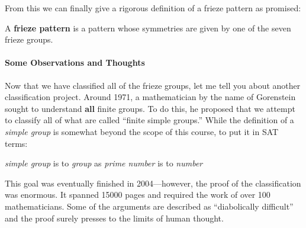 From this we can finally give a rigorous definition of a frieze pattern
as promised:

\begin{dfn}
A \textbf{frieze pattern} is a pattern whose symmetries are given by
one of the seven frieze groups.
\end{dfn}




\paragraph{Some Observations and Thoughts}


Now that we have classified all of the frieze groups, let me tell you about
another classification project. Around 1971, a mathematician by the
name of Gorenstein sought to understand \textbf{all} finite
groups. To do this, he proposed that we attempt to classify all of
what are called ``finite simple groups.'' While the definition of a
\textit{simple group} is somewhat beyond the scope of this course, to
put it in SAT terms:
\begin{center}
\textit{simple group} is to \textit{group} \qquad as \qquad \textit{prime number} is to \textit{number}
\end{center}
This goal was eventually finished in 2004---however, the proof of the
classification was enormous. It spanned 15000 pages and required the
work of over 100 mathematicians. Some of the arguments are described
as ``diabolically difficult'' and the proof surely presses to the
limits of human thought.







\newpage

